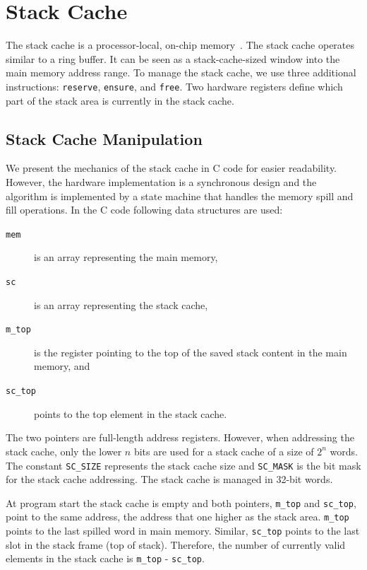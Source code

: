 \documentclass[a4paper,fontsize=10pt,twoside,DIV15,BCOR12mm,headinclude=true,footinclude=false,pagesize,bibtotoc]{scrbook}
\newcommand{\code}[1]{{\texttt{#1}}}
\begin{document}
\section{Stack Cache}
\label{sec:stack-cache}

The stack cache is a processor-local, on-chip memory~\cite{patmos:stack:seus}. The stack
cache operates similar to a ring buffer. It can be seen as a stack-cache-sized
window into the main memory address range.
To manage the stack cache, we use three additional
instructions: \code{reserve}, \code{ensure},
and \code{free}. Two hardware registers define which
part of the stack area is currently in the stack cache.

\subsection{Stack Cache Manipulation}

We present the mechanics of the stack cache in C code for easier readability.
However, the hardware implementation is a synchronous design and
the algorithm is implemented by a state machine that handles
the memory spill and fill operations. In the C code following data structures are used:

\begin{description}
\item[\code{mem}] is an array representing the main memory,
\item[\code{sc}] is an array representing the stack cache,
\item[\code{m\_top}] is the register pointing to the top of the saved stack content in the main memory, and
\item[\code{sc\_top}] points to the top element in the stack cache.
\end{description}

The two pointers are full-length address registers. However,
when addressing the stack cache, only the lower $n$ bits
are used for a stack cache of a size of $2^n$ words.
The constant \code{SC\_SIZE} represents the stack
cache size and \code{SC\_MASK} is the bit mask for
the stack cache addressing. The stack cache is managed in 32-bit
words. %

At program start the stack cache is empty and both pointers,
\code{m\_top} and \code{sc\_top}, point to the same address,
the address that one higher as the stack area. \code{m\_top}
points to the last spilled word in main memory.
Similar, \code{sc\_top} points to the last slot in the stack
frame (top of stack). Therefore, the number of currently valid
elements in the stack cache is \code{m\_top} - \code{sc\_top}.
\end{document}
